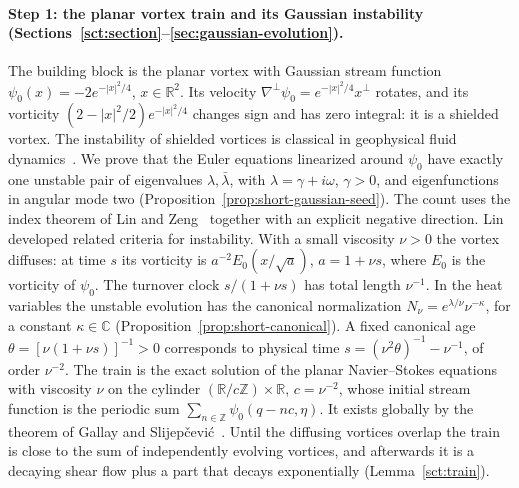 \documentclass[11pt]{article}
\numberwithin{equation}{section}
\theoremstyle{definition}
\theoremstyle{remark}
\theoremstyle{plain}
\newcommand{\R}{\mathbb R}
\newcommand{\C}{\mathbb C}
\begin{document}
\paragraph{Step 1: the planar vortex train and its Gaussian instability
(Sections~\ref{sct:section}--\ref{sec:gaussian-evolution}).}
The building block is the planar vortex with Gaussian stream function
$\psi_0(x)=-2e^{-|x|^2/4}$, $x\in\R^2$. Its velocity
$\nabla^\perp\psi_0=e^{-|x|^2/4}x^\perp$ rotates, and its vorticity
$(2-|x|^2/2)e^{-|x|^2/4}$ changes sign and has zero integral: it is a
shielded vortex. The instability of shielded vortices is classical in
geophysical fluid dynamics~\cite{gent-mcwilliams1986}. We prove that the
Euler equations linearized around $\psi_0$ have exactly one unstable pair
of eigenvalues $\lambda,\bar\lambda$, with $\lambda=\gamma+i\omega$,
$\gamma>0$, and eigenfunctions in angular mode two
(Proposition~\ref{prop:short-gaussian-seed}). The count uses the index
theorem of Lin and Zeng~\cite{lin-zeng2021} together with an explicit
negative direction. Lin~\cite{lin2003} developed related criteria for
instability. With a small viscosity
$\nu>0$ the vortex diffuses: at time $s$ its vorticity is
$a^{-2}E_0(x/\sqrt a)$, $a=1+\nu s$, where $E_0$ is the vorticity of
$\psi_0$. The turnover clock $s/(1+\nu s)$ has total length
$\nu^{-1}$. In the heat variables the unstable evolution has the canonical
normalization $N_\nu=e^{\lambda/\nu}\nu^{-\kappa}$, for a constant
$\kappa\in\C$ (Proposition~\ref{prop:short-canonical}). A fixed canonical
age $\theta=[\nu(1+\nu s)]^{-1}>0$ corresponds to physical time
$s=(\nu^2\theta)^{-1}-\nu^{-1}$, of order $\nu^{-2}$. The train is the
exact solution of the planar Navier--Stokes equations with viscosity
$\nu$ on the cylinder $(\R/c\mathbb Z)\times\R$, $c=\nu^{-2}$, whose
initial stream function is the periodic sum
$\sum_{n\in\mathbb Z}\psi_0(q-nc,\eta)$. It exists globally by the
theorem of Gallay and Slijep\v cevi\'c~\cite{gallay-slijepcevic2015}.
Until the diffusing vortices overlap the train is close to the sum of
independently evolving vortices, and afterwards it is a decaying shear
flow plus a part that decays exponentially (Lemma~\ref{sct:train}).
\end{document}
